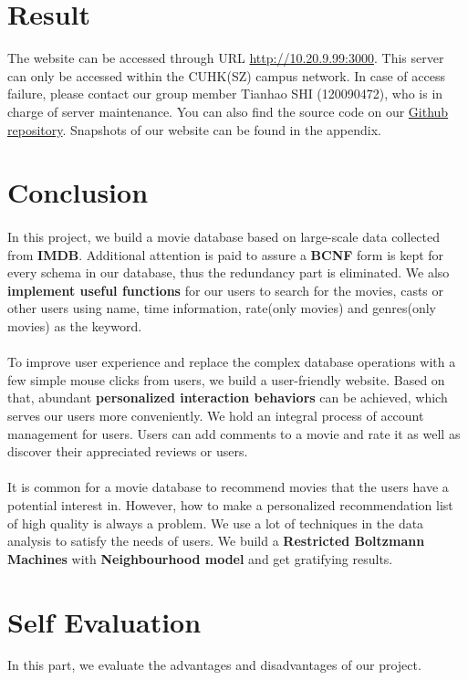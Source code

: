 \begin{CJK*}{UTF8}{gbsn}
\section{Result}
The website can be accessed through URL \href{http://10.20.9.99:3000}{http://10.20.9.99:3000}. This server can only be accessed within the CUHK(SZ) campus network. In case of access failure, please contact our group member Tianhao SHI (120090472), who is in charge of server maintenance. You can also find the source code on our \href{https://github.com/warin2020/rotten-potatoes}{Github repository}. Snapshots of our website can be found in the appendix.
\section{Conclusion}
\paragraph{} In this project, we build a movie database based on large-scale data collected from \textbf{IMDB}. Additional attention is paid to assure a \textbf{BCNF} form is kept for every schema in our database, thus the redundancy part is eliminated. We also \textbf{implement useful functions} for our users to search for the movies, casts or other users using name,  time information, rate(only movies) and genres(only movies) as the keyword.
\paragraph{}To improve user experience and replace the complex database operations with a few simple mouse clicks from users, we build a user-friendly website. Based on that, abundant \textbf{personalized interaction behaviors} can be achieved, which serves our users more conveniently. We hold an integral process of account management for users. Users can add comments to a movie and rate it as well as discover their appreciated reviews or users.
\paragraph{} It is common for a movie database to recommend movies that the users have a potential interest in. However, how to make a personalized recommendation list of high quality is always a problem. We use a lot of techniques in the data analysis to satisfy the needs of users. We build a \textbf{Restricted Boltzmann Machines}  with \textbf{Neighbourhood model} and get gratifying results.
\section{Self Evaluation}
In this part, we evaluate the advantages and disadvantages of our project.

\end{CJK*}
